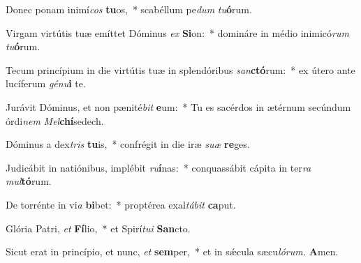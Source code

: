 \item Donec ponam inimí\tinyhspace\textit{cos} \textbf{tu}os,~* scabéllum pe\tinyhspace\textit{dum} \textit{tu}\textbf{ó}rum.
\item Virgam virtútis tuæ emíttet Dóminus \textit{ex} \textbf{Si}on:~* domináre in médio inimicó\textit{rum} \textit{tu}\textbf{ó}rum.
\item Tecum princípium in die virtútis tuæ in splendóribus \textit{san}\textbf{ctó}rum:~* ex útero ante lucíferum \textit{génu}\textbf{i} te.
\item Jurávit Dóminus, et non pænité\textit{bit} \textbf{e}um:~* Tu es sacérdos in ætérnum secúndum órdi\tinyhspace\textit{nem} \textit{Mel}\textbf{chí}sedech.
\item Dóminus a dex\tinyhspace\textit{tris} \textbf{tu}is,~* confrégit in die iræ \textit{suæ} \textbf{re}ges.
\item Judicábit in natiónibus, implébit \textit{ru}\textbf{í}nas:~* conquassábit cápita in ter\textit{ra} \textit{mul}\textbf{tó}rum.
\item De torrénte in vi\textit{a} \textbf{bi}bet:~* proptérea exal\textit{tábit} \textbf{ca}put.
\item Glória Patri, \textit{et} \textbf{Fí}lio,~* et Spirí\tinyhspace\textit{tui} \textbf{San}cto.
\item Sicut erat in princípio, et nunc, \textit{et} \textbf{sem}per,~* et in sǽcula sæcu\tinyhspace\textit{lórum.} \textbf{A}men.